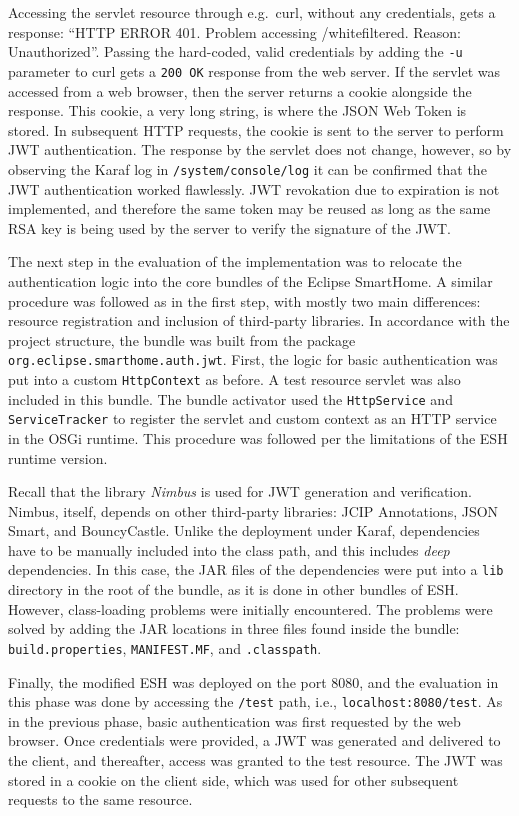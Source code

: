 \documentclass[12pt]{article}
\begin{document}
Accessing the servlet resource through e.g.\ curl, without any credentials, gets a response: ``HTTP ERROR 401. Problem accessing /whitefiltered. Reason: Unauthorized''. Passing the hard-coded, valid credentials by adding the \texttt{-u} parameter to curl gets a \texttt{200 OK} response from the web server. If the servlet was accessed from a web browser, then the server returns a cookie alongside the response. This cookie, a very long string, is where the JSON Web Token is stored. In subsequent HTTP requests, the cookie is sent to the server to perform JWT authentication. The response by the servlet does not change, however, so by observing the Karaf log in \texttt{/system/console/log} it can be confirmed that the JWT authentication worked flawlessly. JWT revokation due to expiration is not implemented, and therefore the same token may be reused as long as the same RSA key is being used by the server to verify the signature of the JWT.

The next step in the evaluation of the implementation was to relocate the authentication logic into the core bundles of the Eclipse SmartHome. A similar procedure was followed as in the first step, with mostly two main differences: resource registration and inclusion of third-party libraries. In accordance with the project structure, the bundle was built from the package \texttt{org.eclipse.smarthome.auth.jwt}. First, the logic for basic authentication was put into a custom \texttt{HttpContext} as before. A test resource servlet was also included in this bundle. The bundle activator used the \texttt{HttpService} and \texttt{ServiceTracker} to register the servlet and custom context as an HTTP service in the OSGi runtime. This procedure was followed per the limitations of the ESH runtime version.

Recall that the library \emph{Nimbus} is used for JWT generation and verification. Nimbus, itself, depends on other third-party libraries: JCIP Annotations, JSON Smart, and BouncyCastle. Unlike the deployment under Karaf, dependencies have to be manually included into the class path, and this includes \emph{deep} dependencies. In this case, the JAR files of the dependencies were put into a \texttt{lib} directory in the root of the bundle, as it is done in other bundles of ESH. However, class-loading problems were initially encountered. The problems were solved by adding the JAR locations in three files found inside the bundle: \texttt{build.properties}, \texttt{MANIFEST.MF}, and \texttt{.classpath}.

Finally, the modified ESH was deployed on the port 8080, and the evaluation in this phase was done by accessing the \texttt{/test} path, i.e., \texttt{localhost:8080/test}. As in the previous phase, basic authentication was first requested by the web browser. Once credentials were provided, a JWT was generated and delivered to the client, and thereafter, access was granted to the test resource. The JWT was stored in a cookie on the client side, which was used for other subsequent requests to the same resource.
\end{document}
